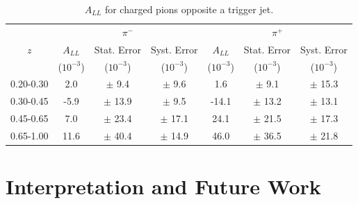 \begin{table}
  \centering
  \begin{tabular}{|c||c|c|c||c|c|c|}
    \hline
    \multirow{3}{*}{$z$} & \multicolumn{3}{c||}{$\pi^{-}$} & \multicolumn{3}{c|}{$\pi^{+}$} \\
    \cline{2-7}
    & $A_{LL}$ & Stat. Error & Syst. Error &$A_{LL}$ & Stat. Error & Syst. Error\\
    & ($10^{-3}$) & ($10^{-3}$) & ($10^{-3}$) & ($10^{-3}$) & ($10^{-3}$) & ($10^{-3}$) \\
    \hline
    \hline
    0.20-0.30 &  2.0 & $\pm$ 9.4 & $\pm$ 9.6 
              &  1.6 & $\pm$ 9.1 & $\pm$ 15.3 \\
    0.30-0.45 & -5.9 & $\pm$ 13.9 & $\pm$ 9.5 
              & -14.1 & $\pm$ 13.2 & $\pm$ 13.1 \\
    0.45-0.65 &  7.0 & $\pm$ 23.4 & $\pm$ 17.1 
              &  24.1 & $\pm$ 21.5 & $\pm$ 17.3 \\
    0.65-1.00 &  11.6 & $\pm$ 40.4 & $\pm$ 14.9 
              &  46.0 & $\pm$ 36.5 & $\pm$ 21.8 \\
    \hline
  \end{tabular}
  \caption{$A_{LL}$ for charged pions opposite a trigger jet.}
  \label{tab:final-2006-result}
\end{table}

\section{Interpretation and Future Work}

